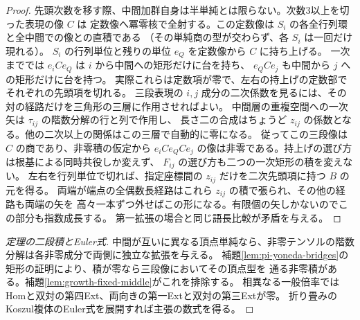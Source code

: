 \begin{proof}
先頭次数を移す際、中間加群自身は半単純とは限らない。次数3以上を切った表現の像 $C$ は
定数像へ冪零核で全射する。この定数像は $S_i$ の各全行列環と全中間での像との直積である
（その単純商の型が交わらず、各 $S_i$ は一回だけ現れる）。
$S_i$ の行列単位と残りの単位 $e_Q$ を定数像から $C$ に持ち上げる。
一次まででは $e_i C e_Q$ は $i$ から中間への矩形だけに台を持ち、
$e_Q C e_j$ も中間から $j$ への矩形だけに台を持つ。
実際これらは定数項が零で、左右の持上げの定数部でそれぞれの先頭項を切れる。
三段表現の $i,j$ 成分の二次係数を見るには、その対の経路だけを三角形の三層に作用させればよい。
中間層の重複空間への一次矢は $\tau_{ij}$ の階数分解の行と列で作用し、
長さ二の合成はちょうど $z_{ij}$ の係数となる。他の二次以上の関係はこの三層で自動的に零になる。
従ってこの三段像は $C$ の商であり、非零積の仮定から
$e_i C e_Q C e_j$ の像は非零である。持上げの選び方は根基による同時共役しか変えず、
$F_{ij}$ の選び方も二つの一次矩形の積を変えない。
左右を行列単位で切れば、指定座標間の $z_{ij}$ だけを二次先頭項に持つ $B$ の元を得る。
両端が端点の全偶数長経路はこれら $z_{ij}$ の積で張られ、その他の経路も両端の矢を
高々一本ずつ外せばこの形になる。有限個の矢しかないのでこの部分も指数成長する。
第一拡張の場合と同じ語長比較が矛盾を与える。
\end{proof}

\begin{proof}[定理の二段積とEuler式]
中間が互いに異なる頂点単純なら、非零テンソルの階数分解は各非零成分で両側に独立な拡張を与える。
補題\ref{lem:pi-yoneda-bridges}の矩形の証明により、積が零なら三段像においてその頂点型を
通る非零積がある。補題\ref{lem:growth-fixed-middle}がこれを排除する。
相異なる一般倍率ではHomと双対の第四Ext、両向きの第一Extと双対の第三Extが零。
折り畳みのKoszul複体のEuler式を展開すれば主張の数式を得る。
\end{proof}
